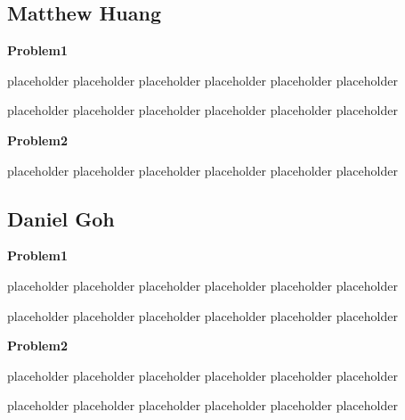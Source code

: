 \documentclass[10pt,journal,compsoc,draftclsnofoot]{IEEEtran}
\begin{document}
\begin{flushleft}
\newpage

\subsection{Matthew Huang}
\textbf{Problem1}
\par
placeholder placeholder placeholder placeholder placeholder placeholder
\par
placeholder placeholder placeholder placeholder placeholder placeholder

\vspace{3mm}

\textbf{Problem2}
\par
placeholder placeholder placeholder placeholder placeholder placeholder

\newpage

\subsection{Daniel Goh}
\textbf{Problem1}
\par
placeholder placeholder placeholder placeholder placeholder placeholder
\par
placeholder placeholder placeholder placeholder placeholder placeholder

\vspace{3mm}

\textbf{Problem2}
\par
placeholder placeholder placeholder placeholder placeholder placeholder
\par
placeholder placeholder placeholder placeholder placeholder placeholder

\newpage

\null
\vfill

\end{flushleft}
\end{document}
